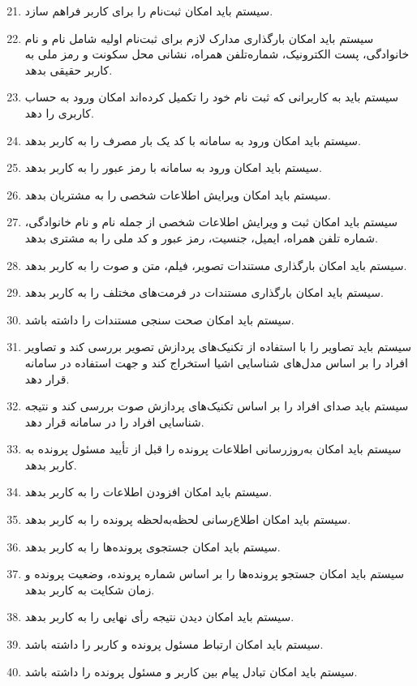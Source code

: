 \documentclass[12pt,a4paper,oneside]{article}
\begin{document}
	\begin{enumerate}[label=.R\arabic*]
		\setcounter{enumi}{20}
		\item سیستم باید امکان ثبت‌نام را برای کاربر فراهم سازد.
		\item سیستم باید امکان بارگذاری مدارک لازم برای ثبت‌نام اولیه شامل نام و نام خانوادگی، پست الکترونیک، شماره‌تلفن همراه، نشانی محل سکونت و رمز ملی به کاربر حقیقی بدهد.
		\item سیستم باید به کاربرانى که ثبت نام خود را تکمیل کرده‌اند امکان ورود به حساب کاربری را دهد.
		\item سیستم باید امکان ورود به سامانه با کد یک بار مصرف را به کاربر بدهد.
		\item سیستم باید امکان ورود به سامانه با رمز عبور را به کاربر بدهد.
		\item سیستم باید امکان ویرایش اطلاعات شخصى را به مشتریان بدهد.
		\item سیستم باید امکان ثبت و ویرایش اطلاعات شخصى از جمله نام و نام خانوادگی، شماره تلفن همراه، ایمیل، جنسیت، رمز عبور و کد ملى را به مشتری بدهد.
		\item سیستم باید امکان بارگذاری مستندات تصویر، فیلم، متن و صوت را به کاربر بدهد.
		\item سیستم باید امکان بارگذاری مستندات در فرمت‌های مختلف را به کاربر بدهد.
		\item سیستم باید امکان صحت سنجی مستندات را داشته باشد.
		\item سیستم باید تصاویر را با استفاده از تکنیک‌های پردازش تصویر بررسی کند و تصاویر افراد را بر اساس مدل‌های شناسایی اشیا استخراج کند و جهت استفاده در سامانه قرار دهد.
		\item سیستم باید صدای افراد را بر اساس تکنیک‌های پردازش صوت بررسی کند و نتیجه شناسایی افراد را در سامانه قرار دهد.
		\item سیستم باید امکان به‌روزرسانی اطلاعات پرونده را قبل از تأیید مسئول پرونده به کاربر بدهد.
		\item سیستم باید امکان افزودن اطلاعات را به کاربر بدهد.
		\item سیستم باید امکان اطلاع‌رسانی لحظه‌به‌لحظه پرونده را به کاربر بدهد.
		\item سیستم باید امکان جستجوی پرونده‌ها را به کاربر بدهد.
		\item سیستم باید امکان جستجو پرونده‌ها را بر اساس شماره پرونده، وضعیت پرونده و زمان شکایت به کاربر بدهد.
		\item سیستم باید امکان دیدن نتیجه رأی نهایی را به کاربر بدهد.
		\item سیستم باید امکان ارتباط مسئول پرونده و کاربر را داشته باشد.
		\item سیستم باید امکان تبادل پیام بین کاربر و مسئول پرونده را داشته باشد.

\end{enumerate}
\end{document}
